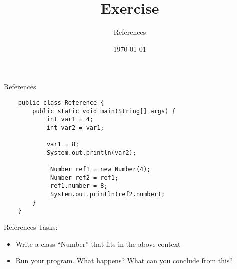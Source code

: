 


\title{Exercise}
\subtitle{References}
\date{\today}




\begin{frame}
    \titlepage
\end{frame}

\begin{frame}{References}
   \begin{lstlisting}
    public class Reference {
        public static void main(String[] args) {
            int var1 = 4;
            int var2 = var1;

            var1 = 8;
            System.out.println(var2);
        
             Number ref1 = new Number(4);    
             Number ref2 = ref1;
             ref1.number = 8;
             System.out.println(ref2.number);
        }
    }\end{lstlisting}
\end{frame}

\begin{frame}{References}
    Tasks:
    \begin{itemize}
        \item Write a class ``Number'' that fits in the above context
        \item Run your program. What happens? What can you conclude from this?
    \end{itemize}
\end{frame}



